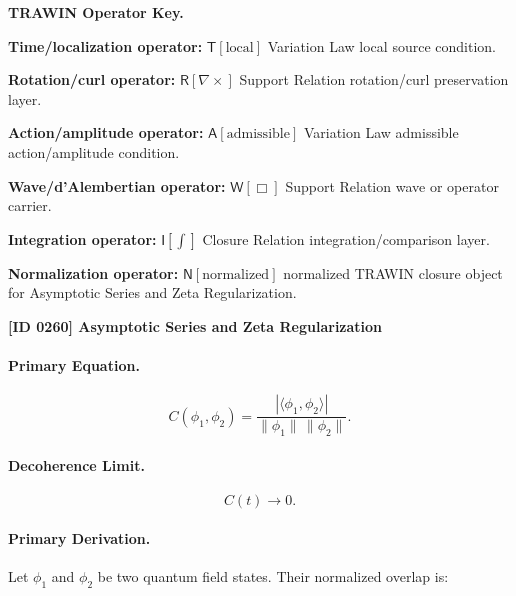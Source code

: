 \par\vspace{0.45\baselineskip}
\noindent\begin{minipage}[t]{\linewidth}
\begingroup
\small
\raggedright
\textbf{TRAWIN Operator Key.}\par
\noindent\textbf{Time/localization operator:} $\mathsf{T}\!\left[\mathrm{local}\right]$ Variation Law local source condition.\par
\noindent\textbf{Rotation/curl operator:} $\mathsf{R}\!\left[\nabla\times\right]$ Support Relation rotation/curl preservation layer.\par
\noindent\textbf{Action/amplitude operator:} $\mathsf{A}\!\left[\mathrm{admissible}\right]$ Variation Law admissible action/amplitude condition.\par
\noindent\textbf{Wave/d'Alembertian operator:} $\mathsf{W}\!\left[\Box\right]$ Support Relation wave or operator carrier.\par
\noindent\textbf{Integration operator:} $\mathsf{I}\!\left[\int\right]$ Closure Relation integration/comparison layer.\par
\noindent\textbf{Normalization operator:} $\mathsf{N}\!\left[\mathrm{normalized}\right]$ normalized TRAWIN closure object for Asymptotic Series and Zeta Regularization.\par
\endgroup
\end{minipage}

\clearpage
\noindent\textbf{[ID 0260] Asymptotic Series and Zeta Regularization}\par
\vspace{0.35em}
\paragraph{Primary Equation.}
\begin{equation}
C(\phi_1,\phi_2)
=
\frac{
|\langle \phi_1,\phi_2\rangle|
}{
\|\phi_1\|\,\|\phi_2\|
}.
\end{equation}

\paragraph{Decoherence Limit.}
\begin{equation}
C(t)\rightarrow 0 .
\end{equation}

\paragraph{Primary Derivation.}
Let $\phi_1$ and $\phi_2$ be two quantum field states.  
Their normalized overlap is:

